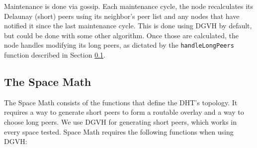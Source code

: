 \documentclass[11pt,conference]{IEEEtran}
\begin{document}
Maintenance is done via gossip.
Each maintenance cycle, the node recalculates its Delaunay (short) peers using its neighbor's peer list and any nodes that have notified it since the last maintenance cycle.
This is done using DGVH by default, but could be done with some other algorithm.
Once those are calculated, the node handles modifying its long peers, as dictated by the \texttt{handleLongPeers} function described in Section \ref{sec:space}.

\subsection{The Space Math}
\label{sec:space}
The Space Math consists of the functions that define the DHT's topology.
It requires a way to generate short peers to form a routable overlay and a way to choose long peers.
We use DGVH for generating short peers, which works in every space tested.
Space Math requires the following functions when using DGVH:
\end{document}
